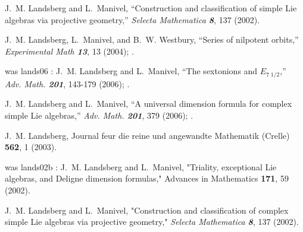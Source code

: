 %
%

 J.~M. Landsberg and L.~Manivel,
    {``Construction and classification of
    simple Lie algebras via projective geometry,''}
    {\em Selecta Mathematica  \bf 8}, 137 (2002). %

 J.~M. Landsberg, L.~Manivel, and B.~W. Westbury,
    {``Series of nilpotent orbits,''}
    {\em Experimental Math \bf 13}, 13 (2004); %
        .

was lands06 :
 J.~M. Landsberg and L.~Manivel,
        ``The sextonions and $E_{7\; 1/2}$,''
        {\em Adv.  Math. \bf 201}, 143-179 (2006); %
        .

 J.~M. Landsberg and L.~Manivel,
        {``A universal dimension
        formula for complex simple Lie algebras,''}
        {\em Adv.  Math. \bf 201}, 379 (2006); %
        .

 J.~M. Landsberg,
Journal feur die reine und angewandte Mathematik (Crelle) {\bf 562}, 1 (2003). %

was lands02b :
 J.~M. Landsberg and L.~Manivel,
    "Triality, exceptional Lie algebras, and Deligne dimension formulas,"
    Advances in Mathematics {\bf171}, 59 (2002). %

 J.~M. Landsberg and L.~Manivel,
    "Construction and classification of complex simple
    Lie algebras via projective geometry,"
    {\em Selecta Mathematica \bf 8}, 137 (2002). %


